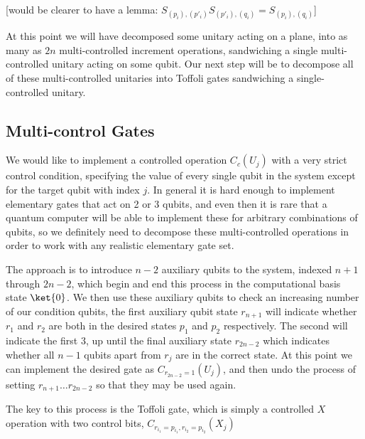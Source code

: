 [would be clearer to have a lemma: $S_{(p_i), (p'_i)}S_{(p'_i), (q_i)}=S_{(p_i), (q_i)}$]

At this point we will have decomposed some unitary acting on a plane, into as many as $2n$ multi-controlled increment operations, sandwiching a single multi-controlled unitary acting on some qubit. Our next step will be to decompose all of these multi-controlled unitaries into Toffoli gates sandwiching a single-controlled unitary.

\subsection{Multi-control Gates}
We would like to implement a controlled operation $C_c(U_j)$ with a very strict control condition, specifying the value of every single qubit in the system except for the target qubit with index $j$. In general it is hard enough to implement elementary gates that act on 2 or 3 qubits, and even then it is rare that a quantum computer will be able to implement these for arbitrary combinations of qubits, so we definitely need to decompose these multi-controlled operations in order to work with any realistic elementary gate set.

The approach is to introduce $n-2$ auxiliary qubits to the system, indexed $n+1$ through $2n-2$, which begin and end this process in the computational basis state $\ket{0}$. We then use these auxiliary qubits to check an increasing number of our condition qubits, the first auxiliary qubit state $r_{n+1}$ will indicate whether $r_1$ and $r_2$ are both in the desired states $p_1$ and $p_2$ respectively. The second will indicate the first 3, up until the final auxiliary state $r_{2n-2}$ which indicates whether all $n-1$ qubits apart from $r_j$ are in the correct state. At this point we can implement the desired gate as $C_{r_{2n-2}=1}(U_j)$, and then undo the process of setting $r_{n+1} \dots r_{2n-2}$ so that they may be used again.

The key to this process is the Toffoli gate, which is simply a controlled $X$ operation with two control bits, $C_{r_{i_1}=p_{i_1},r_{i_2}=p_{i_2}}(X_j)$

